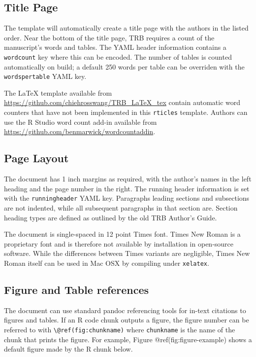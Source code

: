 \documentclass[numbered]{trbunofficial}
\begin{document}
\subsection{Title Page}\label{title-page}

The template will automatically create a title page with the authors in
the listed order. Near the bottom of the title page, TRB requires a
count of the manuscript's words and tables. The YAML header information
contains a \texttt{wordcount} key where this can be encoded. The number
of tables is counted automatically on build; a default 250 words per
table can be overriden with the \texttt{wordspertable} YAML key.

The LaTeX template available from
\url{https://github.com/chiehrosswang/TRB_LaTeX_tex} contain automatic
word counters that have not been implemented in this \texttt{rticles}
template. Authors can use the R Studio word count add-in available from
\url{https://github.com/benmarwick/wordcountaddin}.

\subsection{Page Layout}\label{page-layout}

The document has 1 inch margins as required, with the author's names in
the left heading and the page number in the right. The running header
information is set with the \texttt{runningheader} YAML key. Paragraphs
leading sections and subsections are not indented, while all subsequent
paragraphs in that section are. Section heading types are defined as
outlined by the old TRB Author's Guide.

The document is single-spaced in 12 point Times font. Times New Roman is
a proprietary font and is therefore not available by installation in
open-source software. While the differences between Times variants are
negligible, Times New Roman itself can be used in Mac OSX by compiling
under \texttt{xelatex}.

\subsection{Figure and Table
references}\label{figure-and-table-references}

The document can use standard pandoc referencing tools for in-text
citations to figures and tables. If an R code chunk outputs a figure,
the figure number can be referred to with
\texttt{\textbackslash{}@ref(fig:chunkname)} where \texttt{chunkname} is
the name of the chunk that prints the figure. For example, Figure
@ref(fig:figure-example) shows a default figure made by the R chunk
below.
\end{document}
